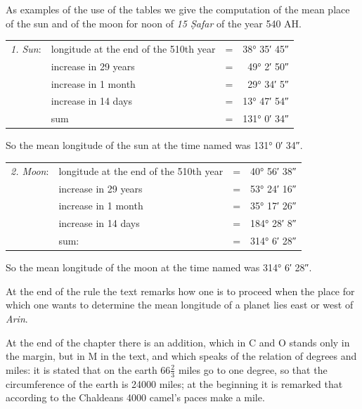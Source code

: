 \documentclass[11pt]{article}
\newcommand{\Pg}[1]{\marginpar{\footnotesize\color{gray}#1}}
\begin{document}
\par As examples of the use of the tables we give the computation of the mean place of the sun and of the moon for noon of \emph{15 Ṣafar} of the year 540 AH.\par
\begin{center}\small\begin{tabular}{llcr}
\emph{1. Sun}: & longitude at the end of the 510th year & = & 38° 35′ 45″ \\
 & increase in 29 years & = & 49° 2′ 50″ \\
 & increase in 1 month & = & 29° 34′ 5″ \\
 & increase in 14 days & = & 13° 47′ 54″ \\
 & sum & = & 131° 0′ 34″ \\
\end{tabular}\end{center}
\par So the mean longitude of the sun at the time named was 131° 0′ 34″.\par
\begin{center}\small\begin{tabular}{llcr}
\emph{2. Moon}: & longitude at the end of the 510th year & = & 40° 56′ 38″ \\
 & increase in 29 years & = & 53° 24′ 16″ \\
 & increase in 1 month & = & 35° 17′ 26″ \\
 & increase in 14 days & = & 184° 28′ 8″ \\
 & sum: & = & 314° 6′ 28″ \\
\end{tabular}\end{center}
\par So the mean longitude of the moon at the time named was 314° 6′ 28″.\par
\par \Pg{43}At the end of the rule the text remarks how one is to proceed when the place for which one wants to determine the mean longitude of a planet lies east or west of \emph{Arin}.\par
\par At the end of the chapter there is an addition, which in C and O stands only in the margin, but in M in the text, and which speaks of the relation of degrees and miles: it is stated that on the earth 66$\tfrac{2}{3}$ miles go to one degree, so that the circumference of the earth is 24000 miles; at the beginning it is remarked that according to the Chaldeans 4000 camel's paces make a mile.\par
\end{document}
